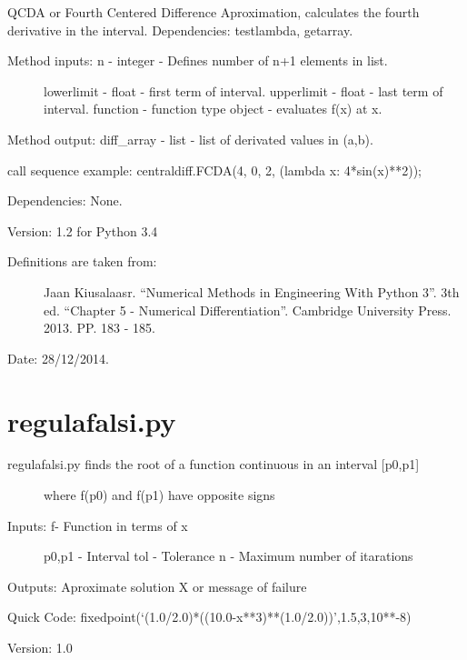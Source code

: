 \documentclass[letterpaper,10pt,oneside]{sphinxmanual}
\theoremstyle{plain}%
\theoremstyle{definition}%
\theoremstyle{remark}%
\begin{document}
QCDA or Fourth Centered Difference Aproximation, calculates the fourth
derivative in the interval. Dependencies: testlambda, getarray.
\begin{description}
\item[{Method inputs: n - integer - Defines number of n+1 elements in list.}] \leavevmode
lowerlimit - float - first term of interval.
upperlimit - float - last term of interval.
function - function type object - evaluates f(x) at x.

\end{description}

Method output: diff\_array - list - list of derivated values in (a,b).

call sequence example: centraldiff.FCDA(4, 0, 2, (lambda x: 4*sin(x)**2));

Dependencies: None.

Version: 1.2 for Python 3.4
\begin{description}
\item[{Definitions are taken from:}] \leavevmode
Jaan Kiusalaasr. ``Numerical Methods in Engineering With Python 3''.
3th ed. ``Chapter 5 - Numerical Differentiation''. 
Cambridge University Press. 2013. PP. 183 - 185.

\end{description}




Date: 28/12/2014.


\section{regulafalsi.py}
\label{code:module-regulafalsi}\label{code:regulafalsi-py}\begin{description}
\item[{regulafalsi.py finds the root of a function continuous in an interval {[}p0,p1{]}}] \leavevmode
where f(p0) and f(p1) have opposite signs

\item[{Inputs: f- Function in terms of x}] \leavevmode
p0,p1 - Interval
tol - Tolerance
n - Maximum number of itarations

\end{description}

Outputs: Aproximate solution X or message of failure

Quick Code: fixedpoint(`(1.0/2.0)*((10.0-x**3)**(1.0/2.0))',1.5,3,10**-8)

Version: 1.0
\end{document}
